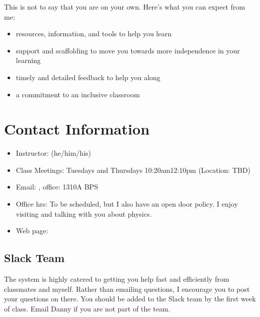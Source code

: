 \documentclass[letterpaper,10pt,english]{jupyterBook}
\begin{document}
\sphinxAtStartPar
This is not to say that you are on your own. Here’s what you can expect from me:
\begin{itemize}
\item {} 
\sphinxAtStartPar
resources, information, and tools to help you learn

\item {} 
\sphinxAtStartPar
support and scaffolding to move you towards more independence in your learning

\item {} 
\sphinxAtStartPar
timely and detailed feedback to help you along

\item {} 
\sphinxAtStartPar
a commitment to an inclusive classroom

\end{itemize}


\section{Contact Information}
\label{\detokenize{content/0_course/syllabus:contact-information}}\begin{itemize}
\item {} 
\sphinxAtStartPar
Instructor:  (he/him/his)

\item {} 
\sphinxAtStartPar
Class Meetings: Tuesdays and Thursdays 10:20am\sphinxhyphen{}12:10pm (Location: TBD)

\item {} 
\sphinxAtStartPar
Email: , office: 1310\sphinxhyphen{}A BPS

\item {} 
\sphinxAtStartPar
Office hrs: To be scheduled, but I also have an open door policy. I enjoy visiting and talking with you about physics.

\item {} 
\sphinxAtStartPar
Web page:

\end{itemize}


\subsection{Slack Team}
\label{\detokenize{content/0_course/syllabus:slack-team}}
\sphinxAtStartPar
{} The system is highly catered to getting you help fast and efficiently from classmates and myself. Rather than emailing questions, I encourage you to post your questions on there. You should be added to the Slack team by the first week of class. Email Danny if you are not part of the team.
\end{document}
